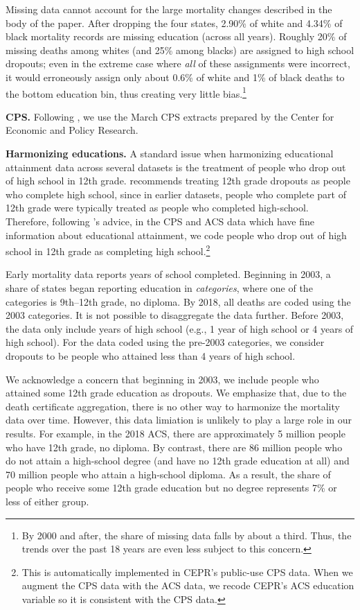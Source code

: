 Missing data cannot account for the large mortality changes
described in the body of the paper. After dropping the four states, 2.90\% of
white and 4.34\% of black mortality records are missing
education (across all years). Roughly 20\% of missing deaths among
whites (and 25\% among blacks) are assigned to high school
dropouts; even in the extreme case where \textit{all} of these
assignments were incorrect, it would erroneously assign only about 0.6\%
of white and 1\% of black deaths to the bottom education bin, thus creating very
little bias.\footnote{By 2000 and after, the share of missing data falls by
  about a third. Thus, the trends over the past 18 years are even less subject to this
  concern.} 

\textbf{CPS.} Following \cite{Case2017}, we use the March
CPS extracts prepared by the Center for Economic and Policy
Research. 

\textbf{Harmonizing educations.} A standard issue when harmonizing
educational attainment data across several datasets is the treatment
of people who drop out of high school in 12th grade. \citet{Jaeger1997}
recommends treating 12th grade dropouts as people who complete
high school, since in earlier datasets, people who complete part of
12th grade were typically treated as people who completed
high-school. Therefore, following \citet{Jaeger1997}'s advice, in the CPS and ACS data which
have fine information about educational attainment, we code people who
drop out of high school in 12th grade as completing high
  school.\footnote{This is automatically implemented in CEPR's public-use CPS
    data. When we augment the CPS data with the ACS data, we recode
    CEPR's ACS education variable so it is consistent with the CPS
    data.}

Early mortality data reports years of
school completed. Beginning in 2003, a share of states began reporting
education in \textit{categories}, where one of the categories is
9th--12th grade, no diploma. By 2018, all deaths are coded using the
2003 categories. It is not possible to disaggregate the
data further. Before 2003, the data only include years of high school
(e.g., 1 year of high school or 4 years of high school). For the data
coded using the pre-2003 categories, we consider dropouts to be people
who attained less than 4 years of high school.

We acknowledge a concern that beginning in 2003, we include people who
attained some 12th grade education as dropouts. We emphasize that, due to
the death certificate aggregation, there is no
other way to harmonize the mortality data over time. However, this data
limiation is unlikely to play a large role in our results. For example, in the 2018
ACS, there are approximately 5 million people who have 12th grade, no
diploma. By contrast, there are 86 million people who do not attain a
high-school degree (and have no 12th grade education at all) and 70
million people who attain a high-school diploma. As a result, the
share of people who receive some 12th grade education but no degree
represents 7\% or less of either group.


